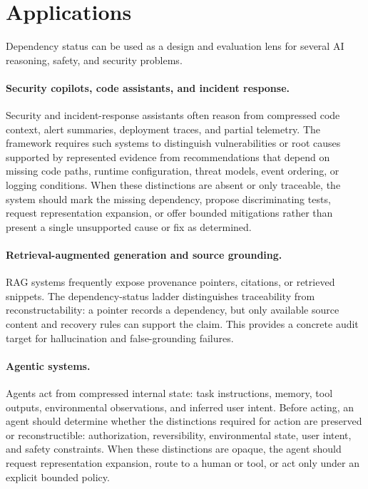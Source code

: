 \documentclass[11pt]{article}
\begin{document}
\section{Applications}

Dependency status can be used as a design and evaluation lens for several AI reasoning, safety, and security problems.

\paragraph{Security copilots, code assistants, and incident response.}
Security and incident-response assistants often reason from compressed code context, alert summaries, deployment traces, and partial telemetry. The framework requires such systems to distinguish vulnerabilities or root causes supported by represented evidence from recommendations that depend on missing code paths, runtime configuration, threat models, event ordering, or logging conditions. When these distinctions are absent or only traceable, the system should mark the missing dependency, propose discriminating tests, request representation expansion, or offer bounded mitigations rather than present a single unsupported cause or fix as determined.

\paragraph{Retrieval-augmented generation and source grounding.}
RAG systems frequently expose provenance pointers, citations, or retrieved snippets. The dependency-status ladder distinguishes traceability from reconstructability: a pointer records a dependency, but only available source content and recovery rules can support the claim. This provides a concrete audit target for hallucination and false-grounding failures.

\paragraph{Agentic systems.}
Agents act from compressed internal state: task instructions, memory, tool outputs, environmental observations, and inferred user intent. Before acting, an agent should determine whether the distinctions required for action are preserved or reconstructible: authorization, reversibility, environmental state, user intent, and safety constraints. When these distinctions are opaque, the agent should request representation expansion, route to a human or tool, or act only under an explicit bounded policy.
\end{document}
